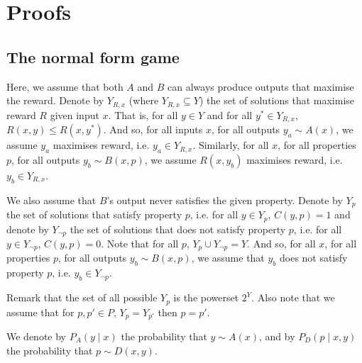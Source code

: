 \section{Proofs}

\subsection{The normal form game}

Here, we assume that both $A$ and $B$ can always produce outputs that maximise the reward. Denote by $Y_{R, x}$ (where $Y_{R, x} \subseteq Y$) the set of solutions that maximise reward $R$ given input $x$. That is, for all $y \in Y$ and for all $y^* \in Y_{R, x}$, $R(x, y) \le R(x, y^*)$. And so, for all inputs $x$, for all outputs $y_a \sim A(x)$, we assume $y_a$ maximises reward, i.e. $y_a \in Y_{R, x}$. Similarly, for all $x$, for all properties $p$, for all outputs $y_b \sim B(x, p)$, we assume $R(x, y_b)$ maximises reward, i.e. $y_b \in Y_{R, x}$.

We also assume that $B$'s output never satisfies the given property. Denote by $Y_{p}$ the set of solutions that satisfy property $p$, i.e. for all $y \in Y_{p}$, $C(y, p) = 1$ and denote by $Y_{\neg p}$ the set of solutions that does not satisfy property $p$, i.e. for all $y \in Y_{\neg p}$, $C(y, p) = 0$. Note that for all $p$, $Y_{p} \cup Y_{\neg p} = Y$. And so, for all $x$, for all properties $p$, for all outputs $y_b \sim B(x, p)$, we assume that $y_b$ does not satisfy property $p$, i.e. $y_b \in Y_{\neg p}$. 

Remark that the set of all possible $Y_{p}$ is the powerset $2^Y$.  Also note that we assume that for $p, p' \in P$, $Y_p = Y_{p'}$ then $p = p'$.
 
We denote by $P_A(y\mid x)$ the probability that $y \sim A(x)$,
and by $P_D(p \mid x, y)$ the probability that $p \sim D(x, y)$.


